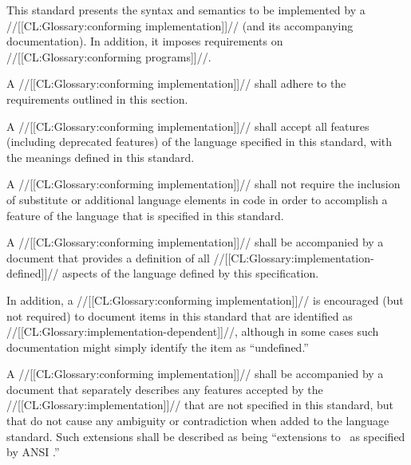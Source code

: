 


This standard presents the syntax and semantics to be implemented by a
//[[CL:Glossary:conforming implementation]]// (and its accompanying documentation).
In addition, it imposes requirements on //[[CL:Glossary:conforming programs]]//.

 
A //[[CL:Glossary:conforming implementation]]// shall adhere to the requirements outlined
in this section.


A //[[CL:Glossary:conforming implementation]]// shall accept all features 
(including deprecated features)
of the language specified in this standard,
with the meanings defined in this standard.

A //[[CL:Glossary:conforming implementation]]// shall not require the inclusion of substitute
or additional language elements in code in order to accomplish a feature of
the language that is specified in this standard.

\endsubsubsection%


A //[[CL:Glossary:conforming implementation]]// shall be accompanied by a document
that provides a definition of all //[[CL:Glossary:implementation-defined]]//
aspects of the language defined by this specification.

In addition, a //[[CL:Glossary:conforming implementation]]// is encouraged (but not required) 
to document items in this standard that are identified as
//[[CL:Glossary:implementation-dependent]]//, although in some cases
such documentation might simply identify the item as ``undefined.''

\endsubsubsection%


A //[[CL:Glossary:conforming implementation]]// shall be accompanied by a
document that separately describes any features accepted by the
//[[CL:Glossary:implementation]]// that are not specified in this standard, but that do not
cause any ambiguity or contradiction when added to the language
standard.  Such extensions shall be described as being ``extensions to
\clisp\ as specified by ANSI .''
 
